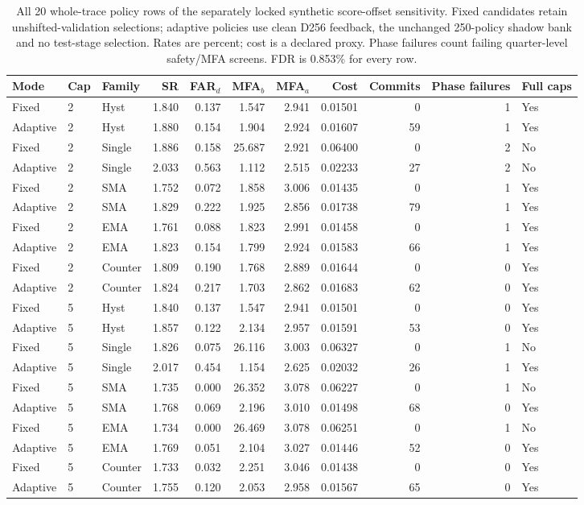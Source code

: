\begin{table}[!htbp]
\centering
\caption{All 20 whole-trace policy rows of the separately locked synthetic score-offset sensitivity. Fixed candidates retain unshifted-validation selections; adaptive policies use clean D256 feedback, the unchanged 250-policy shadow bank and no test-stage selection. Rates are percent; cost is a declared proxy. Phase failures count failing quarter-level safety/MFA screens. FDR is 0.853\% for every row.}
\label{tab:supp_shift_all20}
\scriptsize
\setlength{\tabcolsep}{2.6pt}
\begin{tabular}{lllrrrrrrrl}
\toprule
Mode & Cap & Family & SR & FAR$_d$ & MFA$_b$ & MFA$_a$ & Cost & Commits & Phase failures & Full caps\\
\midrule
Fixed & 2 & Hyst & 1.840 & 0.137 & 1.547 & 2.941 & 0.01501 & 0 & 1 & Yes \\
Adaptive & 2 & Hyst & 1.880 & 0.154 & 1.904 & 2.924 & 0.01607 & 59 & 1 & Yes \\
Fixed & 2 & Single & 1.886 & 0.158 & 25.687 & 2.921 & 0.06400 & 0 & 2 & No \\
Adaptive & 2 & Single & 2.033 & 0.563 & 1.112 & 2.515 & 0.02233 & 27 & 2 & No \\
Fixed & 2 & SMA & 1.752 & 0.072 & 1.858 & 3.006 & 0.01435 & 0 & 1 & Yes \\
Adaptive & 2 & SMA & 1.829 & 0.222 & 1.925 & 2.856 & 0.01738 & 79 & 1 & Yes \\
Fixed & 2 & EMA & 1.761 & 0.088 & 1.823 & 2.991 & 0.01458 & 0 & 1 & Yes \\
Adaptive & 2 & EMA & 1.823 & 0.154 & 1.799 & 2.924 & 0.01583 & 66 & 1 & Yes \\
Fixed & 2 & Counter & 1.809 & 0.190 & 1.768 & 2.889 & 0.01644 & 0 & 0 & Yes \\
Adaptive & 2 & Counter & 1.824 & 0.217 & 1.703 & 2.862 & 0.01683 & 62 & 0 & Yes \\
Fixed & 5 & Hyst & 1.840 & 0.137 & 1.547 & 2.941 & 0.01501 & 0 & 0 & Yes \\
Adaptive & 5 & Hyst & 1.857 & 0.122 & 2.134 & 2.957 & 0.01591 & 53 & 0 & Yes \\
Fixed & 5 & Single & 1.826 & 0.075 & 26.116 & 3.003 & 0.06327 & 0 & 1 & No \\
Adaptive & 5 & Single & 2.017 & 0.454 & 1.154 & 2.625 & 0.02032 & 26 & 1 & Yes \\
Fixed & 5 & SMA & 1.735 & 0.000 & 26.352 & 3.078 & 0.06227 & 0 & 1 & No \\
Adaptive & 5 & SMA & 1.768 & 0.069 & 2.196 & 3.010 & 0.01498 & 68 & 0 & Yes \\
Fixed & 5 & EMA & 1.734 & 0.000 & 26.469 & 3.078 & 0.06251 & 0 & 1 & No \\
Adaptive & 5 & EMA & 1.769 & 0.051 & 2.104 & 3.027 & 0.01446 & 52 & 0 & Yes \\
Fixed & 5 & Counter & 1.733 & 0.032 & 2.251 & 3.046 & 0.01438 & 0 & 0 & Yes \\
Adaptive & 5 & Counter & 1.755 & 0.120 & 2.053 & 2.958 & 0.01567 & 65 & 0 & Yes \\
\bottomrule
\end{tabular}
\end{table}
